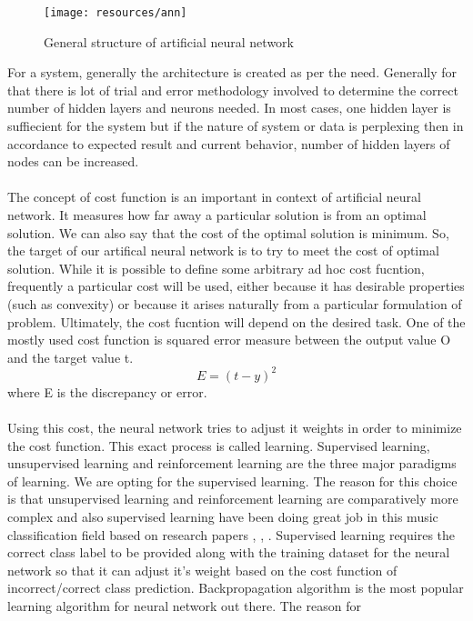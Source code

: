 {\begin{figure}[h]
        \texttt{[image: resources/ann]}
        \caption{General structure of artificial neural network}
\end{figure}
For a system, generally the architecture is created as per the need. Generally for that there is lot of trial and error methodology involved
to determine the correct number of hidden layers and neurons needed. In most cases, one hidden layer is suffiecient for the system but if 
the nature of system or data is perplexing then in accordance to expected result and current behavior, number of hidden layers of nodes can be increased.\\
\\
The concept of cost function is an important in context of artificial neural network. It measures how far away a particular solution is from an
optimal solution. We can also say that the cost of the optimal solution is minimum. So, the target of our artifical neural network is to
try to meet the cost of optimal solution. While it is possible to define some arbitrary ad hoc cost fucntion, frequently a particular cost will be used, either
because it has desirable properties (such as convexity) or because it arises naturally from a particular formulation of problem. Ultimately, the cost
fucntion will depend on the desired task. One of the mostly used cost function is squared error measure between the output value O and the target value t.
\begin{equation}
        E = (t-y)^2
\end{equation}
where E is the discrepancy or error.\\
\\
Using this cost, the neural network tries to adjust it weights in order to minimize the cost function. This exact process is called learning.
Supervised learning, unsupervised learning and reinforcement learning are the three major paradigms of learning. We are opting for the supervised learning.
The reason for this choice is that unsupervised learning and reinforcement learning are comparatively more complex and also supervised learning have been doing 
great job in this music classification field based on research papers \cite{Neumayer2004}, \cite{Haggblade2011}, \cite{Kour2015}. Supervised learning 
requires the correct class label to be provided along with the training dataset for the neural network so that it can adjust it's weight based on the cost function 
of incorrect/correct class prediction. Backpropagation algorithm is the most popular learning algorithm for neural network out there. The reason for
}
